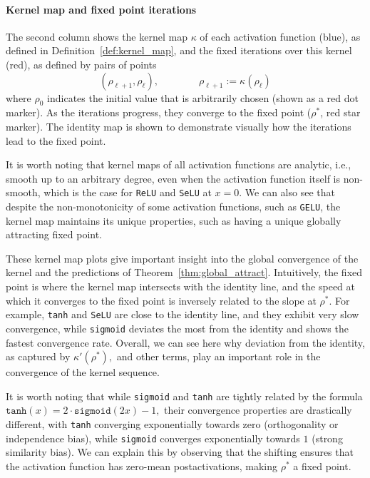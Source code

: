 \documentclass[twoside]{article}
\theoremstyle{definition}
\begin{document}
\paragraph{Kernel map and fixed point iterations} The second column shows the kernel map $\kappa$ of each activation function (blue), as defined in Definition~\ref{def:kernel_map}, and the fixed iterations over this kernel (red), as defined by pairs of points 
$$
(\rho_{\ell+1},\rho_\ell), \qquad \qquad \rho_{\ell+1}:=\kappa(\rho_\ell)
$$
where $\rho_0$ indicates the initial value that is arbitrarily chosen (shown as a red dot marker). As the iterations progress, they converge to the fixed point ($\rho^*$, red star marker). The identity map is shown to demonstrate visually how the iterations lead to the fixed point.  

It is worth noting that kernel maps of all activation functions are analytic, i.e., smooth up to an arbitrary degree, even when the activation function itself is non-smooth, which is the case for \texttt{ReLU} and \texttt{SeLU} at $x=0.$ We can also see that despite the non-monotonicity of some activation functions, such as \texttt{GELU}, the kernel map maintains its unique properties, such as having a unique globally attracting fixed point. 

These kernel map plots give important insight into the global convergence of the kernel and the predictions of Theorem~\ref{thm:global_attract}. Intuitively, the fixed point is where the kernel map intersects with the identity line, and the speed at which it converges to the fixed point is inversely related to the slope at $\rho^*.$ For example, \texttt{tanh} and \texttt{SeLU} are close to the identity line, and they exhibit very slow convergence, while \texttt{sigmoid} deviates the most from the identity and shows the fastest convergence rate. Overall, we can see here why deviation from the identity, as captured by $\kappa'(\rho^*),$ and other terms, play an important role in the convergence of the kernel sequence. 

It is worth noting that while \texttt{sigmoid} and \texttt{tanh} are tightly related by the formula $\texttt{tanh}(x) = 2\cdot\texttt{sigmoid}(2x)-1,$ their convergence properties are drastically different, with \texttt{tanh} converging exponentially towards zero (orthogonality or independence bias), while \texttt{sigmoid} converges exponentially towards $1$ (strong similarity bias). We can explain this by observing that the shifting ensures that the activation function has zero-mean postactivations, making $\rho^*$ a fixed point. 
\end{document}
